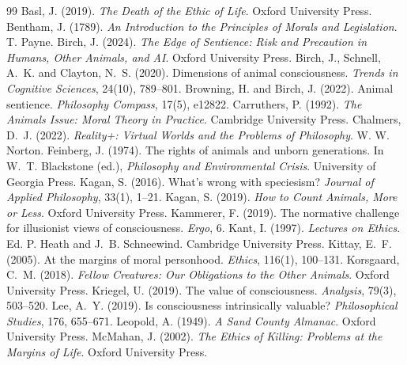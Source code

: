 \documentclass{situationist-preprint}
\begin{document}
\begin{thebibliography}{99}\small
{} Basl, J. (2019). \emph{The Death of the Ethic of Life}. Oxford University Press.
 Bentham, J. (1789). \emph{An Introduction to the Principles of Morals and Legislation}. T. Payne.
 Birch, J. (2024). \emph{The Edge of Sentience: Risk and Precaution in Humans, Other Animals, and AI}. Oxford University Press.
 Birch, J., Schnell, A.~K. and Clayton, N.~S. (2020). Dimensions of animal consciousness. \emph{Trends in Cognitive Sciences}, 24(10), 789--801.
 Browning, H. and Birch, J. (2022). Animal sentience. \emph{Philosophy Compass}, 17(5), e12822.
 Carruthers, P. (1992). \emph{The Animals Issue: Moral Theory in Practice}. Cambridge University Press.
 Chalmers, D.~J. (2022). \emph{Reality+: Virtual Worlds and the Problems of Philosophy}. W. W. Norton.
 Feinberg, J. (1974). The rights of animals and unborn generations. In W.~T. Blackstone (ed.), \emph{Philosophy and Environmental Crisis}. University of Georgia Press.
 Kagan, S. (2016). What's wrong with speciesism? \emph{Journal of Applied Philosophy}, 33(1), 1--21.
 Kagan, S. (2019). \emph{How to Count Animals, More or Less}. Oxford University Press.
 Kammerer, F. (2019). The normative challenge for illusionist views of consciousness. \emph{Ergo}, 6.
 Kant, I. (1997). \emph{Lectures on Ethics}. Ed. P. Heath and J.~B. Schneewind. Cambridge University Press.
 Kittay, E.~F. (2005). At the margins of moral personhood. \emph{Ethics}, 116(1), 100--131.
 Korsgaard, C.~M. (2018). \emph{Fellow Creatures: Our Obligations to the Other Animals}. Oxford University Press.
 Kriegel, U. (2019). The value of consciousness. \emph{Analysis}, 79(3), 503--520.
 Lee, A.~Y. (2019). Is consciousness intrinsically valuable? \emph{Philosophical Studies}, 176, 655--671.
 Leopold, A. (1949). \emph{A Sand County Almanac}. Oxford University Press.
 McMahan, J. (2002). \emph{The Ethics of Killing: Problems at the Margins of Life}. Oxford University Press.

\end{thebibliography}
\end{document}
